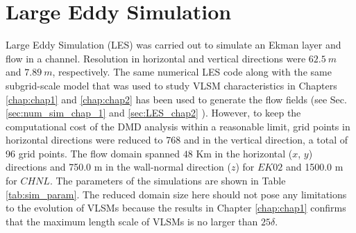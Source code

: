 \section{Large Eddy Simulation}
Large Eddy Simulation (LES) was carried out to simulate an Ekman layer and flow in a channel. Resolution in horizontal and vertical directions were $62.5\ m$ and $7.89\ m$, respectively. The same numerical LES code along with the same subgrid-scale model that was used to study VLSM characteristics in Chapters \ref{chap:chap1} and \ref{chap:chap2} has been used to generate the flow fields (see Sec. \ref{sec:num_sim_chap_1} and \ref{sec:LES_chap2} ). However, to keep the computational cost of the DMD analysis within a reasonable limit, grid points in horizontal directions were reduced to 768 and in the vertical direction, a total of 96 grid points. The flow domain spanned $48$ Km in the horizontal ($x$, $y$) directions and 750.0 m in the wall-normal direction ($z$) for $EK02$ and 1500.0 m for $CHNL$. The parameters of the simulations are shown in Table \ref{tab:sim_param}. The reduced domain size here should not pose any limitations to the evolution of VLSMs because the results in Chapter \ref{chap:chap1} confirms that the maximum length scale of VLSMs is no larger than $25\delta$.



